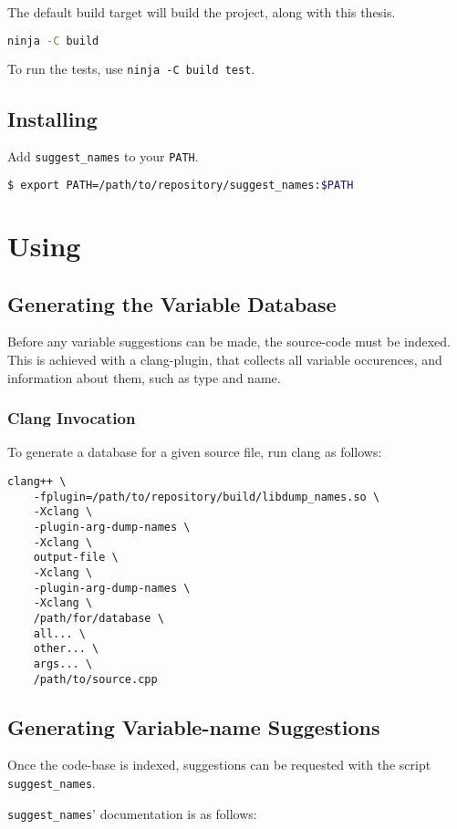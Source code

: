 The default build target will build the project, along with this thesis.
\begin{lstlisting}[language=bash]
ninja -C build
\end{lstlisting}

To run the tests, use \lstinline|ninja -C build test|.

\subsection{Installing}
Add \lstinline|suggest_names| to your \lstinline|PATH|.
\begin{lstlisting}[language=bash]
$ export PATH=/path/to/repository/suggest_names:$PATH
\end{lstlisting}


\section{Using}
\subsection{Generating the Variable Database}
Before any variable suggestions can be made, the source-code must be indexed.
This is achieved with a clang-plugin, that collects all variable occurences,
and information about them, such as type and name.

\subsubsection{Clang Invocation}
To generate a database for a given source file, run clang as follows:

\begin{lstlisting}
clang++ \
	-fplugin=/path/to/repository/build/libdump_names.so \
	-Xclang \
	-plugin-arg-dump-names \
	-Xclang \
	output-file \
	-Xclang \
	-plugin-arg-dump-names \
	-Xclang \
	/path/for/database \
	all... \
	other... \
	args... \
	/path/to/source.cpp
\end{lstlisting}

\subsection{Generating Variable-name Suggestions}
Once the code-base is indexed, suggestions can be requested with the script
\lstinline|suggest_names|.

\lstinline|suggest_names|' documentation is as follows:



